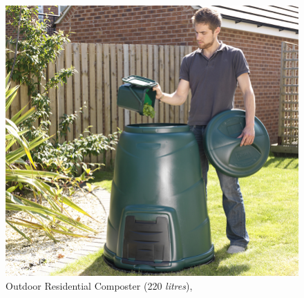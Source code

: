 \documentclass[a4paper,11pt,fleqn]{report}
\begin{document}
\begin{figure}[h!]
\begin{center}
\includegraphics[scale = 1.1]{Outdoor_Composter.jpg}
\caption{Outdoor Residential Composter (220 \textit{litres}), \citep{FDB2018}}
\label{fig: Outdoor Composter}
\end{center}
\end{figure}
\end{document}

